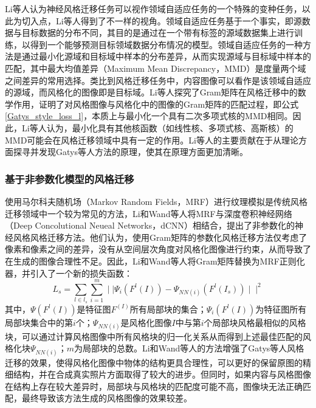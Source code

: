 Li等人\cite{liDemystifyingNeuralStyle2017}认为神经风格迁移任务可以视作领域自适应任务的一个特殊的变种任务，以此为切入点，Li等人得到了不一样的视角。领域自适应任务基于一个事实，即源数据与目标数据的分布不同，其目的是通过在一个带有标签的源域数据集上进行训练，以得到一个能够预测目标领域数据分布情况的模型。领域自适应任务的一种方法是通过最小化源域和目标域中样本的分布差异，从而实现源域与目标域中样本的匹配，其中最大均值差异（Maximum Mean Discrepancy，MMD）是度量两个域之间差异的常用选择。类比到风格迁移任务中，内容图像可以看作是该领域自适应的源域，而风格化的图像即是目标域。Li等人探究了Gram矩阵在风格迁移中的数学作用，证明了对风格图像与风格化中的图像的Gram矩阵的匹配过程，即公式\ref{Gatys_style_loss_l}，本质上与最小化一个具有二次多项式核的MMD相同。因此，Li等人认为，最小化具有其他核函数（如线性核、多项式核、高斯核）的MMD可能会在风格迁移领域中具有一定的作用。Li等人的主要贡献在于从理论方面探寻并发现Gatys等人方法的原理，使其在原理方面更加清晰。

\subsubsection{基于非参数化模型的风格迁移}

使用马尔科夫随机场（Markov Random Fields，MRF）进行纹理模拟是传统风格迁移领域中一个较为常见的方法\cite{ChenHongJiYuYangBenXueXiDeXiaoXiangHuaZiDongShengChengSuanFa2003,liMarkovRandomField1994,crossMarkovRandomField1983,chellappaTextureSynthesisCompression1985,bennettMultispectralRandomField1998}，Li和Wand等人\cite{liCombiningMarkovRandom2016}将MRF与深度卷积神经网络（Deep Concolutional Neueal Networks，dCNN）相结合，提出了非参数化的神经风格风格迁移方法。他们认为，使用Gram矩阵的参数化风格迁移方法仅考虑了像素和像素之间的差异，没有从空间层次角度对风格化图像进行约束，从而导致了在生成的图像合理性不足。因此，Li和Wand等人将Gram矩阵替换为MRF正则化器，并引入了一个新的损失函数：
\begin{equation}
    L_s=\sum_{l\in {l_s}}\sum_{i=1}^m \mid\mid\Psi_i(F^l(I))-\Psi_{NN(i)}(F^l(I_s))\mid\mid^2
\end{equation}其中，$\Psi(F^l(I))$是特征图$F^(I)$所有局部块的集合；$\Psi_i(F^l(I))$为特征图所有局部块集合中的第$i$个；$\Psi_{NN(i)}$是风格化图像$I$中与第$i$个局部块风格最相似的风格块，可以通过计算风格图像中所有风格块的归一化关系从而得到上述最佳匹配的风格化块$\Psi_{NN(i)}$；$m$为局部块的总数。Li和Wand等人的方法增强了Gatys等人风格迁移的效果，使得风格化图像中物体的结构更具合理性，可以更好的保留原图的精细结构，并在合成真实照片方面取得了较大的进步。但同时，如果内容与风格图像在结构上存在较大差异时，局部块与风格块的匹配度可能不高，图像块无法正确匹配，最终导致该方法生成的风格图像的效果较差。


